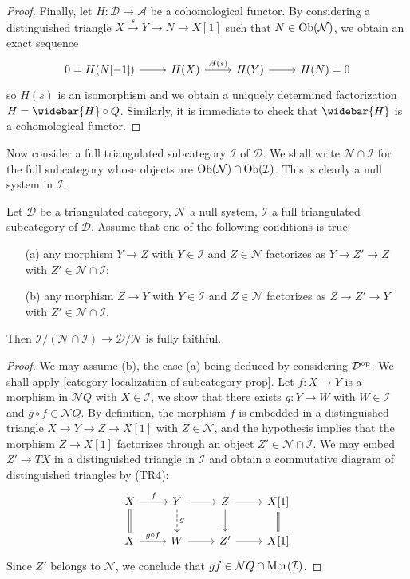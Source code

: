 \begin{proof}
Finally, let $H:\mathcal{D}\to\mathcal{A}$ be a cohomological functor. By considering a distinguished triangle $X\stackrel{s}{\to} Y\to N\to X[1]$ such that $N\in\mathrm{Ob}(\mathcal{N})$, we obtain an exact sequence
\[\begin{tikzcd}
0=H(N[-1])\ar[r]&H(X)\ar[r,"H(s)"]&H(Y)\ar[r]&H(N)=0
\end{tikzcd}\]
so $H(s)$ is an isomorphism and we obtain a uniquely determined factorization $H=\widebar{H}\circ Q$. Similarly, it is immediate to check that $\widebar{H}$ is a cohomological functor.
\end{proof}

Now consider a full triangulated subcategory $\mathcal{I}$ of $\mathcal{D}$. We shall write $\mathcal{N}\cap\mathcal{I}$ for the full subcategory whose objects are $\mathrm{Ob}(\mathcal{N})\cap\mathrm{Ob}(\mathcal{I})$. This is clearly a null system in $\mathcal{I}$.

\begin{proposition}\label{triangle cat localization subcategory functor prop}
Let $\mathcal{D}$ be a triangulated category, $\mathcal{N}$ a null system, $\mathcal{I}$ a full triangulated subcategory of $\mathcal{D}$. Assume that one of the following conditions is true:
\begin{enumerate}
    \item[(a)] any morphism $Y\to Z$ with $Y\in\mathcal{I}$ and $Z\in\mathcal{N}$ factorizes as $Y\to Z'\to Z$ with $Z'\in\mathcal{N}\cap\mathcal{I}$;
    \item[(b)] any morphism $Z\to Y$ with $Y\in\mathcal{I}$ and $Z\in\mathcal{N}$ factorizes as $Z\to Z'\to Y$ with $Z'\in\mathcal{N}\cap\mathcal{I}$.
\end{enumerate}
Then $\mathcal{I}/(\mathcal{N}\cap\mathcal{I})\to\mathcal{D}/\mathcal{N}$ is fully faithful.
\end{proposition}
\begin{proof}
We may assume (b), the case (a) being deduced by considering $\mathcal{D}^{\mathrm{op}}$. We shall apply \cref{category localization of subcategory prop}. Let $f:X\to Y$ is a morphism in $\mathcal{N}Q$ with $X\in\mathcal{I}$, we show that there exists $g:Y\to W$ with $W\in\mathcal{I}$ and $g\circ f\in\mathcal{N}Q$. By definition, the morphism $f$ is embedded in a distinguished triangle $X\to Y\to Z\to X[1]$ with $Z\in\mathcal{N}$, and the hypothesis implies that the morphism $Z\to X[1]$ factorizes through an object $Z'\in\mathcal{N}\cap\mathcal{I}$. We may embed $Z'\to TX$ in a distinguished triangle in $\mathcal{I}$ and obtain a commutative diagram of distinguished triangles by (TR4):
\[\begin{tikzcd}
X\ar[r,"f"]\ar[d,equal]&Y\ar[r]\ar[d,dashed,"g"]&Z\ar[r]\ar[d]&X[1]\ar[d,equal]\\
X\ar[r,"g\circ f"]&W\ar[r]&Z'\ar[r]&X[1]
\end{tikzcd}\]
Since $Z'$ belongs to $\mathcal{N}$, we conclude that $gf\in\mathcal{N}Q\cap\mathrm{Mor}(\mathcal{I})$.
\end{proof}

